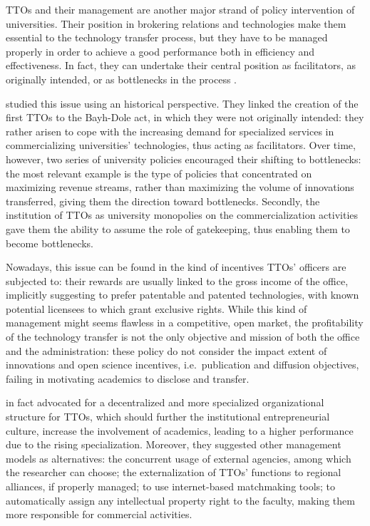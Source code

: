 TTOs and their management are another major strand of policy intervention of universities. Their position in brokering relations and technologies make them essential to the technology transfer process, but they have to be managed properly in order to achieve a good performance both in efficiency and effectiveness. In fact, they can undertake their central position as facilitators, as originally intended, or as bottlenecks in the process \citep{Siegel2003a, Geuna2009}. 

\citet{Litan2008} studied this issue using an historical perspective. They linked the creation of the first TTOs to the Bayh-Dole act, in which they were not originally intended: they rather arisen to cope with the increasing demand for specialized services in commercializing universities' technologies, thus acting as facilitators. Over time, however, two series of university policies encouraged their shifting to bottlenecks: the most relevant example is the type of policies that concentrated on maximizing revenue streams, rather than maximizing the volume of innovations transferred, giving them the direction toward bottlenecks. Secondly, the institution of TTOs as university monopolies on the commercialization activities gave them the ability to assume the role of gatekeeping, thus enabling them to become bottlenecks.

Nowadays, this issue can be found in the kind of incentives TTOs' officers are subjected to: their rewards are usually linked to the gross income of the office, implicitly suggesting to prefer patentable and patented technologies, with known potential licensees to which grant exclusive rights. While this kind of management might seems flawless in a competitive, open market, the profitability of the technology transfer is not the only objective and mission of both the office and the administration: these policy do not consider the impact extent of innovations and open science incentives, i.e.\ publication and diffusion objectives, failing in motivating academics to disclose and transfer. 

\citet{Litan2008} in fact advocated for a decentralized and more specialized organizational structure for TTOs, which should further the institutional entrepreneurial culture, increase the involvement of academics, leading to a higher performance due to the rising specialization. Moreover, they suggested other management models as alternatives: the concurrent usage of external agencies, among which the researcher can choose; the externalization of TTOs' functions to regional alliances, if properly managed; to use internet-based matchmaking tools; to automatically assign any intellectual property right to the faculty, making them more responsible for commercial activities. 

